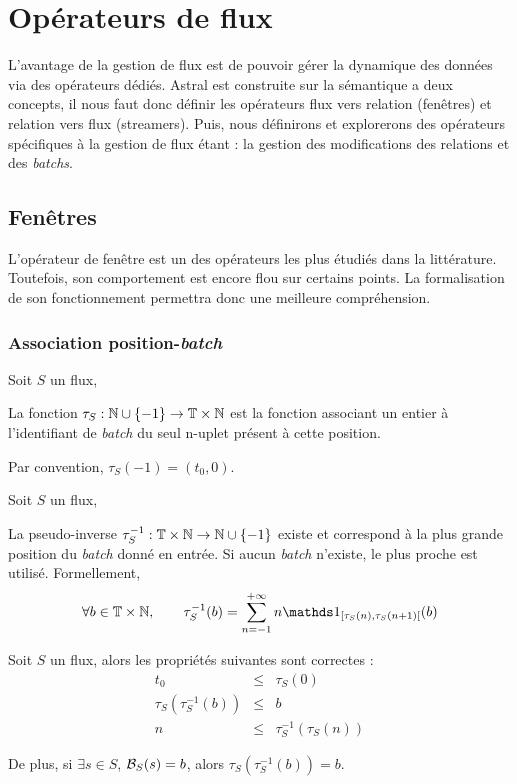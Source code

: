 \section{Opérateurs de flux}
L'avantage de la gestion de flux est de pouvoir gérer la dynamique des données via des opérateurs dédiés. Astral est construite sur la sémantique a deux concepts, il nous faut donc définir les opérateurs flux vers relation (fenêtres) et relation vers flux (streamers). Puis, nous définirons et explorerons des opérateurs spécifiques à la gestion de flux étant : la gestion des modifications des relations et des \textit{batchs}.
\subsection{Fenêtres}
L'opérateur de fenêtre est un des opérateurs les plus étudiés dans la littérature. Toutefois, son comportement est encore flou sur certains points. La formalisation de son fonctionnement permettra donc une meilleure compréhension.
\subsubsection{Association position-\textit{batch}}
\begin{defi}\label{def:tau}
    Soit $S$ un flux,

    La fonction $\tau_S : \mathbb{N}\cup\{-1\}\to \mathbb{T}\times\mathbb{N}$ est la fonction associant un entier à l'identifiant de \textit{batch} du seul n-uplet présent à cette position.

    Par convention, $\tau_S(-1)=(t_0,0)$.
\end{defi}
\begin{coro}
    Soit $S$ un flux,

    La pseudo-inverse $\tau_S^{-1}:\mathbb{T}\times\mathbb{N}\to \mathbb{N}\cup\{-1\}$ existe et correspond à la plus grande position du \textit{batch} donné en entrée. Si aucun \textit{batch} n'existe, le plus proche est utilisé. Formellement, $$\forall b \in \TN, \qquad \tau_S^{-1}(b) = \sum_{n=-1}^{+\infty} n \indic_{[\tau_S(n),\tau_S(n+1)[}(b)$$
\end{coro}

\begin{prop}
    Soit $S$ un flux, alors les propriétés suivantes sont correctes :
    \begin{eqnarray*}
        t_0 & \leq & \tau_S(0) \\
        \tau_S(\tau_S^{-1}(b)) & \leq & b \\
        n & \leq & \tau_S^{-1}(\tau_S(n))
    \end{eqnarray*}

    De plus, si $\exists s \in S$, $\mathcal{B}_S(s)=b$, alors $\tau_S(\tau_S^{-1}(b)) = b$.
\end{prop}

